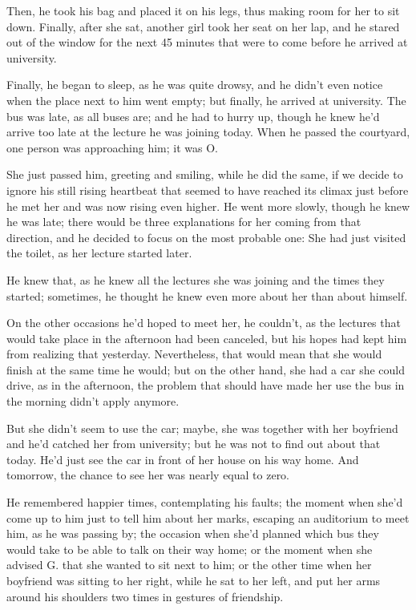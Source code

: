 Then, he took his bag and placed it on his legs, thus making room for her to sit down. Finally, after she sat, another girl took her seat on her lap, and he stared out of the window for the next 45 minutes that were to come before he arrived at university.

Finally, he began to sleep, as he was quite drowsy, and he didn't even notice when the place next to him went empty; but finally, he arrived at university. 
The bus was late, as all buses are; and he had to hurry up, though he knew he'd arrive too late at the lecture he was joining today. 
When he passed the courtyard, one person was approaching him; it was O.

She just passed him, greeting and smiling, while he did the same, if we decide to ignore his still rising heartbeat that seemed to have reached its climax just before he met her and was now rising even higher. He went more slowly, though he knew he was late; there would be three explanations for her coming from that direction, and he decided to focus on the most probable one: She had just visited the toilet, as her lecture started later.

He knew that, as he knew all the lectures she was joining and the times they started; sometimes, he thought he knew even more about her than about himself.

On the other occasions he'd hoped to meet her, he couldn't, as the lectures that would take place in the afternoon had been canceled, but his hopes had kept him from realizing that yesterday. 
Nevertheless, that would mean that she would finish at the same time he would; but on the other hand, she had a car she could drive, as in the afternoon, the problem that should have made her use the bus in the morning didn't apply anymore.

But she didn't seem to use the car; maybe, she was together with her boyfriend and he'd catched her from university; but he was not to find out about that today. 
He'd just see the car in front of her house on his way home. 
And tomorrow, the chance to see her was nearly equal to zero.

He remembered happier times, contemplating his faults; the moment when she'd come up to him just to tell him about her marks, escaping an auditorium to meet him, as he was passing by; the occasion when she'd planned which bus they would take to be able to talk on their way home; or the moment when she advised G. that she wanted to sit next to him; or the other time when her boyfriend was sitting to her right, while he sat to her left, and put her arms around his shoulders two times in gestures of friendship.

